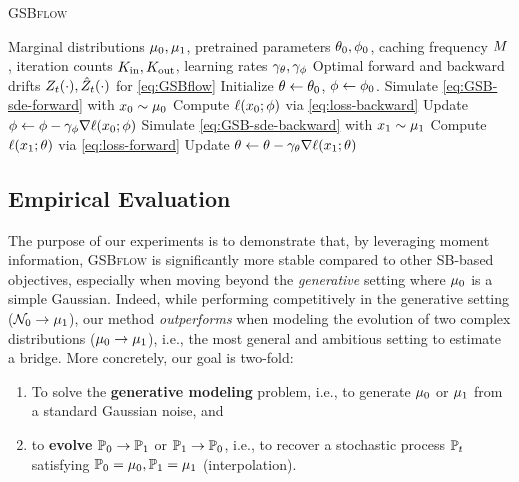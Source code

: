 \begin{algorithm}[t]
   \caption{\textsc{GSBflow}}
   \label{alg:GSBflow}
\begin{algorithmic}
    Marginal distributions $\mu_0, \mu_1$, pretrained parameters $\theta_{0}, \phi_{0}$, caching frequency $M$, iteration counts $K_\textup{in}, K_\textup{out}$, learning rates $\gamma_{\theta},\gamma_{\phi}$ %
    Optimal forward and backward drifts $Z_t(\cdot), \hat{Z}_t(\cdot)$ for \eqref{eq:GSBflow}
\smallskip
   \STATE Initialize $\theta \leftarrow \theta_0$, $\phi \leftarrow \phi_0$.
   \STATE Simulate \eqref{eq:GSB-sde-forward} with $x_0 \sim \mu_0$
   \ENDIF
   \STATE Compute $\lossb$ via \eqref{eq:loss-backward}
   \STATE Update $\paramb \subs \paramb - \lrb\nabla \lossb$
   \ENDFOR
   \STATE Simulate \eqref{eq:GSB-sde-backward} with $x_1 \sim \mu_1$
   \ENDIF
   \STATE Compute $\lossf$ via \eqref{eq:loss-forward}
   \STATE Update $\paramf \subs \paramf - \lrf\nabla \lossf$
   \ENDFOR
   \ENDFOR
\end{algorithmic}
\end{algorithm}

\subsection{Empirical Evaluation}
\label{sec:experiments}

The purpose of our experiments is to demonstrate that, by leveraging moment information, \textsc{GSBflow} is significantly more stable compared to other \acrshort{SB}-based objectives, especially when moving beyond the \emph{generative} setting where $\mu_0$ is a simple Gaussian. Indeed, while performing competitively in the {generative} setting ($\mathcal{N}_0 \rightarrow \mu_1$), our method \textit{outperforms} when modeling the evolution of two complex distributions ($\mu_0 \rightarrow \mu_1$), i.e., the most general and ambitious setting to estimate a bridge. 
More concretely, our goal is two-fold: 
\begin{enumerate}[itemsep=.0cm,topsep=0cm]
\item To solve the \textbf{generative modeling} problem, i.e., to generate $\mu_0$ or $\mu_1$ from a standard Gaussian noise, and
\item to \textbf{evolve} $\mathbb{P}_{{0}}\to\mathbb{P}_{{1}}$ or $\mathbb{P}_{{1}}\to\mathbb{P}_{{0}}$, i.e., to recover a stochastic process $\mathbb{P}_{{t}}$ satisfying $\mathbb{P}_{{0}} = \mu_0, \mathbb{P}_{{1}} = \mu_1$ (interpolation).
\end{enumerate}

